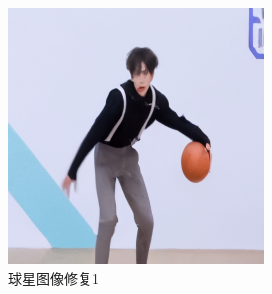 \begin{figure}[H]
\begin{minipage}[b]{0.3\linewidth}
  \end{minipage}
\hspace{0.1cm}
  \begin{minipage}[b]{0.3\linewidth}
    \includegraphics[width=\linewidth]{Picture/recon/kun1_recon.png}
  \end{minipage}
  \caption{球星图像修复1}
\end{figure}



